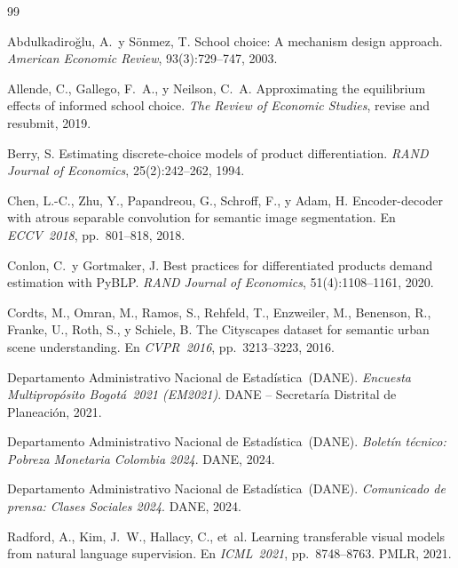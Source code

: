 \documentclass[12pt,a4paper]{article}
\begin{document}
\begin{thebibliography}{99}

Abdulkadiro\u{g}lu, A.\ y S\"onmez, T.
\newblock School choice: A mechanism design approach.
\newblock \emph{American Economic Review}, 93(3):729--747, 2003.

Allende, C., Gallego, F.~A., y Neilson, C.~A.
\newblock Approximating the equilibrium effects of informed school choice.
\newblock \emph{The Review of Economic Studies}, revise and resubmit, 2019.

Berry, S.
\newblock Estimating discrete-choice models of product differentiation.
\newblock \emph{RAND Journal of Economics}, 25(2):242--262, 1994.

Chen, L.-C., Zhu, Y., Papandreou, G., Schroff, F., y Adam, H.
\newblock Encoder-decoder with atrous separable convolution for semantic image
  segmentation.
\newblock En \emph{ECCV~2018}, pp.~801--818, 2018.

Conlon, C.\ y Gortmaker, J.
\newblock Best practices for differentiated products demand estimation with {PyBLP}.
\newblock \emph{RAND Journal of Economics}, 51(4):1108--1161, 2020.

Cordts, M., Omran, M., Ramos, S., Rehfeld, T., Enzweiler, M.,
Benenson, R., Franke, U., Roth, S., y Schiele, B.
\newblock The {Cityscapes} dataset for semantic urban scene understanding.
\newblock En \emph{CVPR~2016}, pp.~3213--3223, 2016.

Departamento Administrativo Nacional de Estadística~(DANE).
\newblock \emph{Encuesta Multipropósito Bogotá~2021 (EM2021)}.
\newblock DANE -- Secretaría Distrital de Planeación, 2021.

Departamento Administrativo Nacional de Estadística~(DANE).
\newblock \emph{Boletín técnico: Pobreza Monetaria Colombia 2024}.
\newblock DANE, 2024.

Departamento Administrativo Nacional de Estadística~(DANE).
\newblock \emph{Comunicado de prensa: Clases Sociales 2024}.
\newblock DANE, 2024.

Radford, A., Kim, J.~W., Hallacy, C., et~al.
\newblock Learning transferable visual models from natural language supervision.
\newblock En \emph{ICML~2021}, pp.~8748--8763. PMLR, 2021.


\end{thebibliography}
\end{document}

